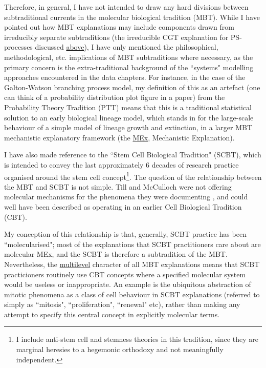 Therefore, in general, I have not intended to draw any hard divisions between subtraditional currents in the molecular biological tradition (MBT). While I have pointed out how MBT explanations may include components drawn from irreducibly separate subtraditions (the irreducible CGT explanation for PS-processes discussed \hyperref[PS]{above}), I have only mentioned the philosophical, methodological, etc. implications of MBT subtraditions where necessary, as the primary concern is the extra-traditional background of the ``systems" modelling approaches encountered in the data chapters. For instance, in the case of the Galton-Watson branching process model, my definition of this as an artefact (one can think of a probability distribution plot figure in a paper) from the Probability Theory Tradition (PTT) means that this is a traditional statistical solution to an early biological lineage model, which stands in for the large-scale behaviour of a simple model of lineage growth and extinction, in a larger MBT mechanistic explanatory framework (the \hyperref[EHJMEx]{MEx}, Mechanistic Explanation).

I have also made reference to the ``Stem Cell Biological Tradition" (SCBT), which is intended to convey the last approximately 6 decades of research practice organised around the stem cell concept\footnote{I include anti-stem cell and stemness theories in this tradition, since they are marginal heresies to a hegemonic orthodoxy and not meaningfully independent.}. The question of the relationship between the MBT and SCBT is not simple. Till and McCulloch were not offering molecular mechanisms for the phenomena they were documenting \cite{McCulloch1960}, and could well have been described as operating in an earlier Cell Biological Tradition (CBT).

 My conception of this relationship is that, generally, SCBT practice has been ``molecularised"; most of the explanations that SCBT practitioners care about are molecular MEx, and the SCBT is therefore a subtradition of the MBT. Nevertheless, the \hyperref[hierarchy]{multilevel} character of all MBT explanations means that SCBT practicioners routinely use CBT concepts where a specified molecular system would be useless or inappropriate. An example is the ubiquitous abstraction of mitotic phenomena as a class of cell behaviour in SCBT explanations (referred to simply as ``mitosis", ``proliferation", ``renewal" etc), rather than making any attempt to specify this central concept in explicitly molecular terms.


